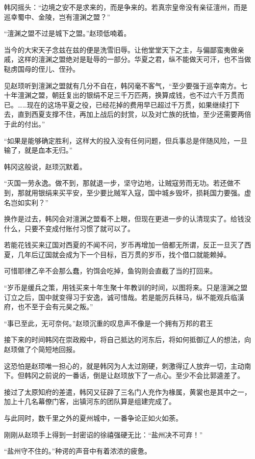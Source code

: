 韩冈摇头：“边境之安不是求来的，而是争来的。若真宗皇帝没有亲征澶州，而是巡幸蜀中、金陵，岂有澶渊之盟？”

“澶渊之盟不过是城下之盟。”赵顼低喃着。

当今的大宋天子念兹在兹的便是洗雪旧辱。让他堂堂天下之主，与偏鄙蛮夷做亲戚，这样的澶渊之盟绝对是耻辱的一部分。华夏之君，纵不能做天可汗，也不当做鞑虏国母的侄儿、侄孙。

见赵顼听到澶渊之盟就有几分不自在，韩冈毫不客气，“至少要强于巡幸南方。七十年澶渊之盟，朝廷复出的银绢不足三千万匹两，换算成钱，也不过六千万贯而已。……现在的这场平夏之役，已经花掉的费用早已超过千万贯，如果继续打下去，直到西夏支撑不住，再加上战后的封赏，以及对亡族的抚恤，至少还需要两倍于此的付出。”

“如果是能够确定胜利，这样大的投入没有任何问题，但兵事总是伴随风险，一旦输了，就是血本无归。”

韩冈这般说，赵顼沉默着。

“灭国一劳永逸。做不到，那就退一步，坚守边地，让贼寇劳而无功。若还做不到，那就用银绢来买平安，至少要比贼军入寇，国中城乡毁坏，损耗国力要强。虚名岂如实利？”

换作是过去，韩冈会对澶渊之盟看不上眼，但现在更进一步的认清现实了。给钱没什么，只要不变成付账付习惯了就可以了。

若能花钱买来辽国对西夏的不闻不问，岁币再增加一倍都无所谓，反正一旦灭了西夏，几年后辽国就会成为下一个目标，百万贯的岁币，找个借口就能赖掉。

可惜耶律乙辛不会那么蠢，钓饵会吃掉，鱼钩则会直截了当的打回来。

“岁币是缓兵之策，用钱买来十年生聚十年教训的时间，以图将来。只是澶渊之盟订立之后，国中就变得习于安逸，诚可惜哉。若是能厉兵秣马，纵不能观兵临潢府，也不至于会有元昊之叛。”

“事已至此，无可奈何。”赵顼沉重的叹息声不像是一个拥有万邦的君王

接下来的时间韩冈在崇政殿中，将自己抵达的河东后，将如何抵御辽人的想法，向赵顼做了个简短地回报。

这恐怕是赵顼唯一担心的，就是韩冈为人太过刚硬，刺激得辽人放弃一切，主动南下。但韩冈之前说的一番话，倒是让赵顼放下了一点心。至少不会比郭逵差了。

接过了太原知府的差遣，韩冈又征辟了三名门人充作为椽属，黄裳也是其中之一，加上十几名幕僚门客，出镇河东的团队算是组建完成了。

与此同时，数千里之外的夏州城中，一番争论正如火如荼。

刚刚从赵顼手上得到一封密诏的徐禧强硬无比：“盐州决不可弃！”

“盐州守不住的。”种谔的声音中有着浓浓的疲惫。


